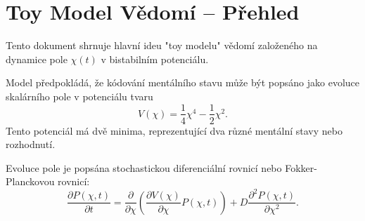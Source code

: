 \documentclass{article}
\begin{document}
\section*{Toy Model Vědomí – Přehled}

Tento dokument shrnuje hlavní ideu "toy modelu" vědomí založeného na dynamice pole $\chi(t)$ v bistabilním potenciálu.

Model předpokládá, že kódování mentálního stavu může být popsáno jako evoluce skalárního pole v potenciálu tvaru
\[
V(\chi) = \frac{1}{4} \chi^4 - \frac{1}{2} \chi^2.
\]
Tento potenciál má dvě minima, reprezentující dva různé mentální stavy nebo rozhodnutí.

Evoluce pole je popsána stochastickou diferenciální rovnicí nebo Fokker-Planckovou rovnicí:
\[
\frac{\partial P(\chi, t)}{\partial t} = \frac{\partial}{\partial \chi} \left( \frac{\partial V(\chi)}{\partial \chi} P(\chi, t) \right) + D \frac{\partial^2 P(\chi, t)}{\partial \chi^2}.
\]
\end{document}
